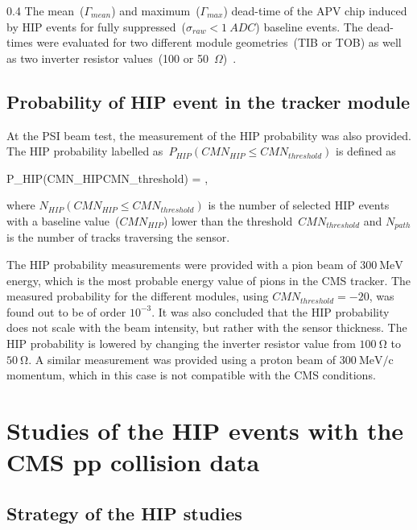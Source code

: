                  {0.4}       %
                 {The mean~($\Gamma_{mean}$) and maximum~($\Gamma_{max}$) dead-time of the APV chip induced by HIP events for fully suppressed~($\sigma_{raw}<1~ADC$) baseline events. The dead-times were evaluated for two different module geometries~(TIB or TOB) as well as two inverter resistor values~(100 or 50~$\Omega$)~\cite{Bainbridge:2004jc}.} %


\subsection{Probability of HIP event in the tracker module}

At the PSI beam test, the measurement of the HIP probability was also provided. The HIP probability labelled as~$P_{HIP}(CMN_{HIP}\leq CMN_{threshold})$ is defined as 

{
P_{HIP}(CMN_{HIP}\leq CMN_{threshold}) = ,
}

where $N_{HIP}(CMN_{HIP}\leq CMN_{threshold})$ is the number of selected HIP events with a baseline value~($CMN_{HIP}$) lower than the threshold~$CMN_{threshold}$ and $N_{path}$ is the number of tracks traversing the sensor.

The HIP probability measurements were provided with a pion beam of $300~\mathrm{MeV}$ energy, which is the most probable energy value of pions in the CMS tracker. The measured probability for the different modules, using $CMN_{threshold}=-20$, was found out to be of order $10^{-3}$. It was also concluded that the HIP probability does not scale with the beam intensity, but rather with the sensor thickness. The HIP probability is lowered by changing the inverter resistor value from $100~\mathrm{\Omega}$ to  $50~\mathrm{\Omega}$. A similar measurement was provided using a proton beam of  $300~\mathrm{MeV/c}$ momentum, which in this case is not compatible with the CMS conditions.


\section{Studies of the HIP events with the CMS pp collision data}

\subsection{Strategy of the HIP studies}

